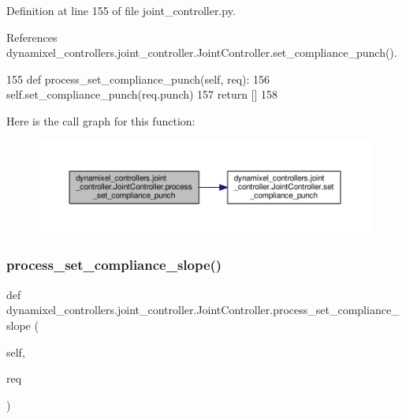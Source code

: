 Definition at line 155 of file joint\+\_\+controller.\+py.



References dynamixel\+\_\+controllers.\+joint\+\_\+controller.\+Joint\+Controller.\+set\+\_\+compliance\+\_\+punch().


\begin{DoxyCode}
155     \textcolor{keyword}{def }process\_set\_compliance\_punch(self, req):
156         self.set\_compliance\_punch(req.punch)
157         \textcolor{keywordflow}{return} []
158 
\end{DoxyCode}
Here is the call graph for this function\+:
\nopagebreak
\begin{figure}[H]
\begin{center}
\leavevmode
\includegraphics[width=350pt]{d3/dcd/classdynamixel__controllers_1_1joint__controller_1_1_joint_controller_ac3d7aea8d47f24ab10c1162f34cce44f_cgraph}
\end{center}
\end{figure}
\mbox{\label{classdynamixel__controllers_1_1joint__controller_1_1_joint_controller_a6390c0c20afc0581dd3b1122c894d175}} 
\subsubsection{\texorpdfstring{process\+\_\+set\+\_\+compliance\+\_\+slope()}{process\_set\_compliance\_slope()}}
{\footnotesize\ttfamily def dynamixel\+\_\+controllers.\+joint\+\_\+controller.\+Joint\+Controller.\+process\+\_\+set\+\_\+compliance\+\_\+slope (\begin{DoxyParamCaption}\item[{}]{self,  }\item[{}]{req }\end{DoxyParamCaption})}



